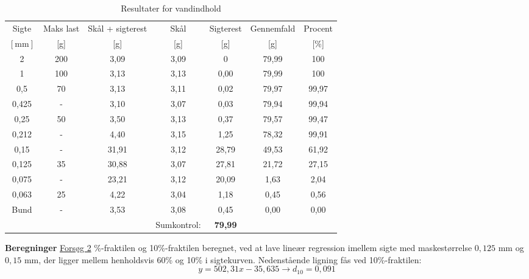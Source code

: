 \begin{table} [H]
	\begin{center}
		\begin{tabular}{ c c c c c c c} 
			\hline
		Sigte & Maks last & Skål + sigterest & Skål & Sigterest & Gennemfald & Procent      \\
		$[\text{mm}]$ & [g] & [g] & [g] & [g] & [g] & [\%] \\ \hline
		2        & 200         & 3,09               & 3,09   & 0           & 79,99        & 100   \\
		1        & 100         & 3,13               & 3,13   & 0,00        & 79,99        & 100   \\
		0,5      & 70          & 3,13               & 3,11   & 0,02        & 79,97        & 99,97 \\
		0,425    & -           & 3,10               & 3,07   & 0,03        & 79,94        & 99,94 \\
		0,25     & 50          & 3,50               & 3,13   & 0,37        & 79,57        & 99,47 \\
		0,212    & -           & 4,40               & 3,15   & 1,25        & 78,32        & 99,91 \\
		0,15     & -           & 31,91              & 3,12   & 28,79       & 49,53        & 61,92 \\
		0,125    & 35          & 30,88              & 3,07   & 27,81       & 21,72        & 27,15 \\
		0,075    & -           & 23,21              & 3,12   & 20,09       & 1,63         & 2,04  \\
		0,063    & 25          & 4,22               & 3,04   & 1,18        & 0,45         & 0,56  \\
		Bund     & -           & 3,53               & 3,08   & 0,45        & 0,00         & 0,00 \\
		& & & Sumkontrol: & \textbf{79,99} & & \\
		\end{tabular}
		\caption{Resultater for vandindhold}
		\label{tab:forsogto}
	\end{center}
\end{table}


\textbf{Beregninger}
\newline
\underline{Forsøg 2}
\%-fraktilen og 10\%-fraktilen beregnet, ved at lave lineær regression imellem sigte med maskestørrelse $0,\!125$ mm og $0,\!15$ mm, der ligger mellem henholdsvis 60\% og 10\% i sigtekurven. 
\newline
\newline
Nedenstående ligning fås ved 10\%-fraktilen:
\begin{equation}
	y = 502,\!31x - 35,\!635 \rightarrow d_{10}=0,\!091
\end{equation}

